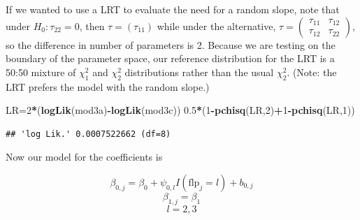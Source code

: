 \documentclass[ignorenonframetext,]{beamer}
\newenvironment{Shaded}{\begin{snugshade}}{\end{snugshade}}
\newcommand{\KeywordTok}[1]{\textcolor[rgb]{0.13,0.29,0.53}{\textbf{#1}}}
\newcommand{\DecValTok}[1]{\textcolor[rgb]{0.00,0.00,0.81}{#1}}
\newcommand{\FloatTok}[1]{\textcolor[rgb]{0.00,0.00,0.81}{#1}}
\newcommand{\OperatorTok}[1]{\textcolor[rgb]{0.81,0.36,0.00}{\textbf{#1}}}
\newcommand{\NormalTok}[1]{#1}
\begin{document}
\begin{frame}[fragile]{}

If we wanted to use a LRT to evaluate the need for a random slope, note
that under \(H_0: \tau_{22}=0\), then \(\tau=(\tau_{11})\) while under
the alternative,
\(\tau=\begin{pmatrix} \tau_{11}& \tau_{12} \\ \tau_{12} & \tau_{22} \end{pmatrix}\),
so the difference in number of parameters is 2. Because we are testing
on the boundary of the parameter space, our reference distribution for
the LRT is a 50:50 mixture of \(\chi^2_1\) and \(\chi^2_2\)
distributions rather than the usual \(\chi^2_2\). (Note: the LRT prefers
the model with the random slope.)

\begin{Shaded}
\begin{Highlighting}[]
\NormalTok{LR=}\DecValTok{2}\OperatorTok{*}\NormalTok{(}\KeywordTok{logLik}\NormalTok{(mod3a)}\OperatorTok{-}\KeywordTok{logLik}\NormalTok{(mod3c))}
\FloatTok{0.5}\OperatorTok{*}\NormalTok{(}\DecValTok{1}\OperatorTok{-}\KeywordTok{pchisq}\NormalTok{(LR,}\DecValTok{2}\NormalTok{)}\OperatorTok{+}\DecValTok{1}\OperatorTok{-}\KeywordTok{pchisq}\NormalTok{(LR,}\DecValTok{1}\NormalTok{))}
\end{Highlighting}
\end{Shaded}

\begin{verbatim}
## 'log Lik.' 0.0007522662 (df=8)
\end{verbatim}

\end{frame}

\begin{frame}{}

Now our model for the coefficients is

\[\beta_{0,j}=\beta_0+\psi_{0,l}I(\text{flp}_j=l)+b_{0,j}\]
\[\beta_{1,j}=\beta_1\] \[l=2,3\]

\end{frame}
\end{document}
